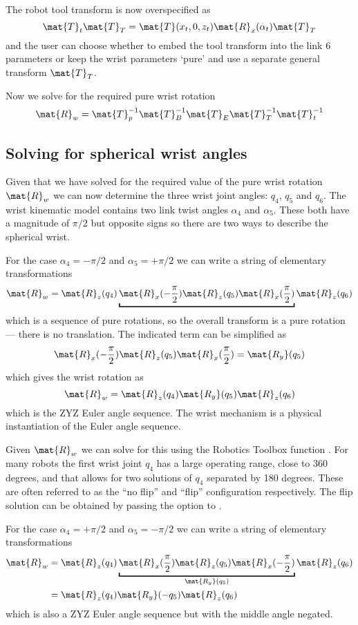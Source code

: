 \documentclass[11pt]{article}
\numberwithin{equation}{section}
\begin{document}
The robot tool transform is now overspecified as 
\[
\mat{T}_t \mat{T}_T = \mat{T}(x_t, 0, z_t) \mat{R}_x(\alpha_t) \mat{T}_T
\]
and the user can choose whether to embed the tool transform into the link 6 parameters or keep the wrist parameters `pure' and use a separate general
transform $\mat{T}_T$.

Now we solve  for the required pure wrist rotation
\[
\mat{R}_w = \mat{T}_p^{-1} \mat{T}_B^{-1} \mat{T}_E \mat{T}_T^{-1} \mat{T}_t^{-1}
\]


\subsection{Solving for spherical wrist angles}

Given that we have solved for the required value of the pure wrist rotation $\mat{R}_w$ we can now determine the three wrist joint angles:
$q_4$, $q_5$ and $q_6$.
The wrist kinematic model contains two link twist angles $\alpha_4$ and $\alpha_5$.
These both have a magnitude of $\pi/2$ but opposite signs so there are two ways to describe the spherical wrist.

For the case  $\alpha_4=-\pi/2$ and $\alpha_5=+\pi/2$ we can write a string of elementary transformations
\[
\mat{R}_w = \mat{R}_z(q_4) \underbracket{\mat{R}_x(-\frac{\pi}{2})  \mat{R}_z(q_5)  \mat{R}_x(\frac{\pi}{2})}  \mat{R}_z(q_6)
\]
which is a sequence of pure rotations, so the overall transform is a pure rotation --- there is no translation.
The indicated term  can be simplified as
\[
\mat{R}_x(-\frac{\pi}{2})  \mat{R}_z(q_5)  \mat{R}_x(\frac{\pi}{2}) = \mat{R_y}(q_5)
\]
which gives the wrist rotation as
\[
\mat{R}_w = \mat{R}_z(q_4) \mat{R_y}(q_5)  \mat{R}_z(q_6)
\]
which is the ZYZ Euler angle sequence.  The wrist mechanism is a physical instantiation of the Euler angle sequence.

Given $\mat{R}_w$ we can solve for this using the Robotics Toolbox function .
For many robots the first wrist joint $q_4$ has a large operating range, close to 360 degrees, and that allows for two solutions of $q_4$ separated
by 180 degrees.  These are often referred to as the ``no flip'' and ``flip'' configuration respectively.
The flip solution can be obtained by passing the option  to .

For the case  $\alpha_4=+\pi/2$ and $\alpha_5=-\pi/2$ we can write a string of elementary transformations
\begin{align}
\mat{R}_w &= \mat{R}_z(q_4) \underbracket{\mat{R}_x(\frac{\pi}{2})  \mat{R}_z(q_5)  \mat{R}_x(-\frac{\pi}{2})}_{\mat{R_y}(q_5)}  \mat{R}_z(q_6) \\
&= \mat{R}_z(q_4) \mat{R_y}(-q_5)  \mat{R}_z(q_6)
\end{align}
which is also a ZYZ Euler angle sequence but with the middle angle negated.
\end{document}
